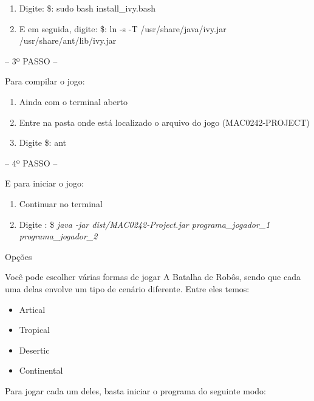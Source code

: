 \documentclass[a4paper]{article}
\begin{document}
{{{\begin{enumerate}
	\item Digite: \$: sudo bash install\_ivy.bash

	\item E em seguida, digite: \$: ln -s -T /usr/share/java/ivy.jar /usr/share/ant/lib/ivy.jar

\end{enumerate}

\bigskip


\textcolor{NavyBlue}{-- 3º PASSO --}

Para compilar o jogo:

\begin{enumerate}
	\item Ainda com o terminal aberto

	\item Entre na pasta onde está localizado o arquivo do jogo (MAC0242-PROJECT)

	\item Digite \$: ant
\end{enumerate}

\bigskip



\textcolor{NavyBlue}{-- 4º PASSO --}

E para iniciar o jogo: 

\begin{enumerate}                                            
	\item Continuar no terminal
 	\item Digite : \$ \textit{ java -jar dist/MAC0242-Project.jar programa\_jogador\_1 programa\_jogador\_2} 
\end{enumerate}

\bigskip


\newpage %

{\textcolor{NavyBlue}{\LARGE Opções}

Você pode escolher várias formas de jogar A Batalha de Robôs,
sendo que cada uma delas envolve um tipo de cenário diferente.
Entre eles temos:

\begin{itemize}
	\item Artical
	\item Tropical
	\item Desertic
	\item Continental
\end{itemize}

Para jogar cada um deles, basta iniciar o programa do seguinte modo:

}}}}
\end{document}
